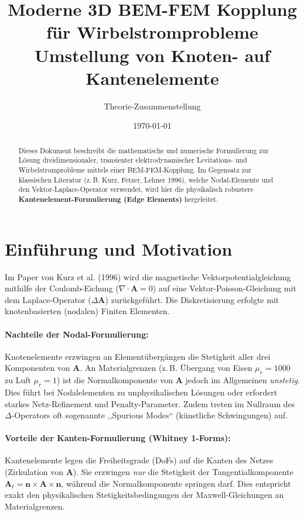 \documentclass[11pt,a4paper]{article}
\title{\textbf{Moderne 3D BEM-FEM Kopplung für Wirbelstromprobleme}\\
\Large Umstellung von Knoten- auf Kantenelemente}
\author{Theorie-Zusammenstellung}
\date{\today}
\newcommand{\vA}{\bm{A}}
\newcommand{\vn}{\bm{n}}
\renewcommand{\div}{\nabla \cdot}
\begin{document}
\maketitle

\begin{abstract}
Dieses Dokument beschreibt die mathematische und numerische Formulierung zur Lösung dreidimensionaler, transienter elektrodynamischer Levitations- und Wirbelstromprobleme mittels einer BEM-FEM-Kopplung. Im Gegensatz zur klassischen Literatur (z.\,B. Kurz, Fetzer, Lehner 1996), welche Nodal-Elemente und den Vektor-Laplace-Operator verwendet, wird hier die physikalisch robustere \textbf{Kantenelement-Formulierung (Edge Elements)} hergeleitet.
\end{abstract}

\tableofcontents
\vspace{1cm}

\section{Einführung und Motivation}
Im Paper von Kurz et al. (1996) wird die magnetische Vektorpotentialgleichung mithilfe der Coulomb-Eichung ($\div \vA = 0$) auf eine Vektor-Poisson-Gleichung mit dem Laplace-Operator ($\Delta \vA$) zurückgeführt. Die Diskretisierung erfolgte mit knotenbasierten (nodalen) Finiten Elementen. 

\paragraph{Nachteile der Nodal-Formulierung:} 
Knotenelemente erzwingen an Elementübergängen die Stetigkeit aller drei Komponenten von $\vA$. An Materialgrenzen (z.\,B. Übergang von Eisen $\mu_r = 1000$ zu Luft $\mu_r = 1$) ist die Normalkomponente von $\vA$ jedoch im Allgemeinen \textit{unstetig}. Dies führt bei Nodalelementen zu unphysikalischen Lösungen oder erfordert starkes Netz-Refinement und Penalty-Parameter. Zudem treten im Nullraum des $\Delta$-Operators oft sogenannte ,,Spurious Modes`` (künstliche Schwingungen) auf.

\paragraph{Vorteile der Kanten-Formulierung (Whitney 1-Forms):}
Kantenelemente legen die Freiheitsgrade (DoFs) auf die Kanten des Netzes (Zirkulation von $\vA$). Sie erzwingen \textit{nur} die Stetigkeit der Tangentialkomponente $\vA_t = \vn \times \vA \times \vn$, während die Normalkomponente springen darf. Dies entspricht exakt den physikalischen Stetigkeitsbedingungen der Maxwell-Gleichungen an Materialgrenzen.
\end{document}
